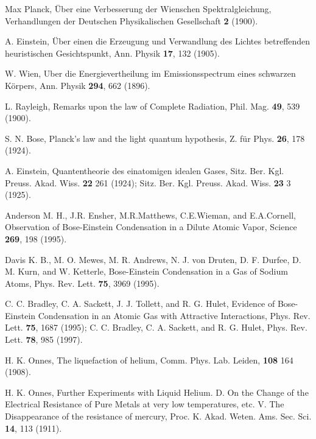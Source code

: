 \documentclass[12pt,a4paper]{jbook}
\begin{document}
\begin{thebibliography}{99}
        Max Planck,
        \"{U}ber eine Verbesserung der Wienschen Spektralgleichung,
        Verhandlungen der Deutschen Physikalischen Gesellschaft {\bf 2} (1900).

		A. Einstein,
		\"{U}ber einen die Erzeugung und Verwandlung des Lichtes betreffenden heuristischen Gesichtspunkt,
		Ann. Physik {\bf 17}, 132 (1905).

		W. Wien,
		Uber die Energievertheilung im Emissionsspectrum eines schwarzen K\"{o}rpers,
		Ann. Physik {\bf 294}, 662 (1896).

		L. Rayleigh,
		Remarks upon the law of Complete Radiation,
		Phil. Mag. {\bf 49}, 539 (1900).

		S. N. Bose, 
		Planck's law and the light quantum hypothesis,
		Z. f\"{u}r Phys. {\bf 26}, 178 (1924).

		A. Einstein,
		Quantentheorie des einatomigen idealen Gases,
		Sitz. Ber. Kgl. Preuss. Akad. Wiss. {\bf 22} 261 (1924);
		Sitz. Ber. Kgl. Preuss. Akad. Wiss. {\bf 23} 3 (1925).

		Anderson M. H., J.R. Ensher, M.R.Matthews, C.E.Wieman, and E.A.Cornell,
		Observation of Bose-Einstein Condensation in a Dilute Atomic Vapor,
		Science {\bf 269}, 198 (1995).

		Davis K. B., M. O. Mewes, M. R. Andrews, N. J. von Druten,
		D. F. Durfee, D. M. Kurn, and W. Ketterle,
		Bose-Einstein Condensation in a Gas of Sodium Atoms,
		Phys. Rev. Lett. {\bf 75}, 3969 (1995).

        C. C. Bradley, C. A. Sackett, J. J. Tollett, and R. G. Hulet,
		Evidence of Bose-Einstein Condensation in an Atomic Gas with Attractive Interactions,
        Phys. Rev. Lett. {\bf 75}, 1687 (1995);
        C. C. Bradley, C. A. Sackett, and R. G. Hulet,
        Phys. Rev. Lett. {\bf 78}, 985 (1997).

        H. K. Onnes,
        The liquefaction of helium,
        Comm. Phys. Lab. Leiden, {\bf 108} 164 (1908).

        H. K. Onnes,
        Further Experiments with Liquid Helium. D. 
        On the Change of the Electrical Resistance of Pure Metals 
        at very low temperatures, 
        etc. V. The Disappearance of the resistance of mercury,
        Proc. K. Akad. Weten. Ams. Sec. Sci. {\bf 14}, 113 (1911).


\end{thebibliography}
\end{document}
